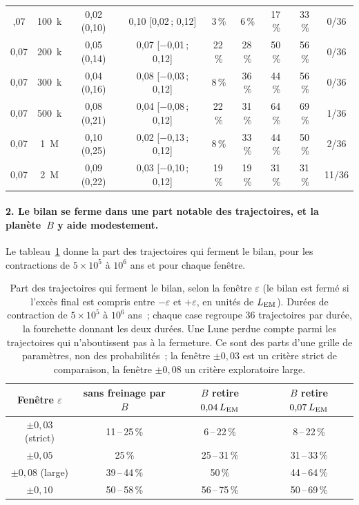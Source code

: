 \documentclass[11pt,a4paper]{article}
\newcommand{\LEM}{\ensuremath{L_{\rm EM}}}
\begin{document}
\begin{table}[htbp]
\begin{tabular}{ccccccccc}
\addlinespace
0,07 & 100~k & 0,02 (0,10) & 0,10 [0,02\,; 0,12] & 3\,\% & 6\,\% & 17\,\% & 33\,\% & 0/36 \\
0,07 & 200~k & 0,05 (0,14) & 0,07 [$-$0,01\,; 0,12] & 22\,\% & 28\,\% & 50\,\% & 56\,\% & 0/36 \\
0,07 & 300~k & 0,04 (0,16) & 0,08 [$-$0,03\,; 0,12] & 8\,\% & 36\,\% & 44\,\% & 56\,\% & 0/36 \\
0,07 & 500~k & 0,08 (0,21) & 0,04 [$-$0,08\,; 0,12] & 22\,\% & 31\,\% & 64\,\% & 69\,\% & 1/36 \\
0,07 & 1~M & 0,10 (0,25) & 0,02 [$-$0,13\,; 0,12] & 8\,\% & 33\,\% & 44\,\% & 50\,\% & 2/36 \\
0,07 & 2~M & 0,09 (0,22) & 0,03 [$-$0,10\,; 0,12] & 19\,\% & 19\,\% & 31\,\% & 31\,\% & 11/36 \\
\bottomrule\end{tabular}\end{table}

\paragraph{2. Le bilan se ferme dans une part notable des trajectoires, et la planète~$B$ y aide modestement.} Le tableau~\ref{tab:fenetres} donne la part des trajectoires qui ferment le bilan, pour les contractions de $5\times10^5$ à $10^6$ ans et pour chaque fenêtre.

\begin{table}[htbp]\centering\small
\caption{Part des trajectoires qui ferment le bilan, selon la fenêtre $\varepsilon$ (le bilan est fermé si l'excès final est compris entre $-\varepsilon$ et $+\varepsilon$, en unités de $\LEM$). Durées de contraction de $5\times10^5$ à $10^6$ ans~; chaque case regroupe $36$ trajectoires par durée, la fourchette donnant les deux durées. Une Lune perdue compte parmi les trajectoires qui n'aboutissent pas à la fermeture. Ce sont des parts d'une grille de paramètres, non des probabilités~; la fenêtre $\pm0{,}03$ est un critère strict de comparaison, la fenêtre $\pm0{,}08$ un critère exploratoire large.\label{tab:fenetres}}
\begin{tabular}{cccc}\toprule
Fenêtre $\varepsilon$ & sans freinage par $B$ & $B$ retire $0{,}04\,\LEM$ & $B$ retire $0{,}07\,\LEM$ \\
\midrule
$\pm0{,}03$ (strict) & 11\,--\,25\,\% & 6\,--\,22\,\% & 8\,--\,22\,\% \\
$\pm0{,}05$ & 25\,\% & 25\,--\,31\,\% & 31\,--\,33\,\% \\
$\pm0{,}08$ (large) & 39\,--\,44\,\% & 50\,\% & 44\,--\,64\,\% \\
$\pm0{,}10$ & 50\,--\,58\,\% & 56\,--\,75\,\% & 50\,--\,69\,\% \\
\bottomrule\end{tabular}\end{table}
\end{document}
